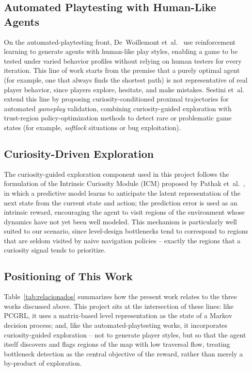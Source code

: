 \documentclass[sigconf,nonacm,language=english]{acmart}
\begin{document}
\subsection{Automated Playtesting with Human-Like Agents}

On the automated-playtesting front, De~Woillemont
et~al.~\cite{dewoillemont2022automated} use reinforcement learning to
generate agents with human-like play styles, enabling a game to be tested
under varied behavior profiles without relying on human testers for every
iteration. This line of work starts from the premise that a purely optimal
agent (for example, one that always finds the shortest path) is not
representative of real player behavior, since players explore, hesitate,
and make mistakes. Sestini et~al.~\cite{sestini2022automated} extend this
line by proposing curiosity-conditioned proximal trajectories for automated
\emph{gameplay} validation, combining curiosity-guided exploration with
trust-region policy-optimization methods to detect rare or problematic game
states (for example, \emph{softlock} situations or bug exploitation).

\subsection{Curiosity-Driven Exploration}

The curiosity-guided exploration component used in this project follows
the formulation of the Intrinsic Curiosity Module (ICM) proposed by Pathak
et~al.~\cite{pathak2017curiosity}, in which a predictive model learns to
anticipate the latent representation of the next state from the current
state and action; the prediction error is used as an intrinsic reward,
encouraging the agent to visit regions of the environment whose dynamics
have not yet been well modeled. This mechanism is particularly well suited
to our scenario, since level-design bottlenecks tend to correspond to
regions that are seldom visited by naive navigation policies -- exactly the
regions that a curiosity signal tends to prioritize.

\subsection{Positioning of This Work}

Table~\ref{tab:relacionados} summarizes how the present work relates to the
three works discussed above. This project sits at the intersection of
these lines: like PCGRL, it uses a matrix-based level representation as the
state of a Markov decision process; and, like the automated-playtesting
works, it incorporates curiosity-guided exploration -- not to generate
player styles, but so that the agent itself discovers and flags regions of
the map with low traversal flow, treating bottleneck detection as the
central objective of the reward, rather than merely a by-product of
exploration.
\end{document}

